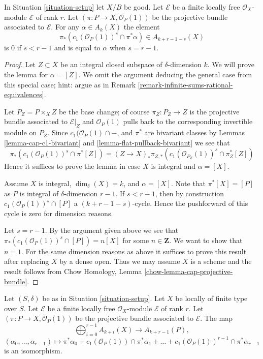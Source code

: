 \begin{lemma}
\label{lemma-cap-projective-bundle}
In Situation \ref{situation-setup} let $X/B$ be good.
Let $\mathcal{E}$ be a finite locally free $\mathcal{O}_X$-module
$\mathcal{E}$ of rank $r$. Let $(\pi : P \to X, \mathcal{O}_P(1))$
be the projective bundle associated to $\mathcal{E}$.
For any $\alpha \in A_k(X)$ the element
$$
\pi_*\left(
c_1(\mathcal{O}_P(1))^s \cap \pi^*\alpha
\right)
\in
A_{k + r - 1 - s}(X)
$$
is $0$ if $s < r - 1$ and is equal to $\alpha$ when $s = r - 1$.
\end{lemma}

\begin{proof}
Let $Z \subset X$ be an integral closed subspace of $\delta$-dimension $k$.
We will prove the lemma for $\alpha = [Z]$. We omit the argument
deducing the general case from this special case; hint: argue as in
Remark \ref{remark-infinite-sums-rational-equivalences}.

\medskip\noindent
Let $P_Z = P \times_X Z$ be the base change; of course
$\pi_Z : P_Z \to Z$ is the projective bundle associated to $\mathcal{E}|_Z$
and $\mathcal{O}_P(1)$ pulls back to the corresponding
invertible module on $P_Z$. Since $c_1(\mathcal{O}_P(1) \cap -$, and
$\pi^*$ are bivariant classes by Lemmas
\ref{lemma-cap-c1-bivariant} and \ref{lemma-flat-pullback-bivariant}
we see that
$$
\pi_*\left(
c_1(\mathcal{O}_P(1))^s \cap \pi^*[Z]
\right)
=
(Z \to X)_*\pi_{Z, *}\left(
c_1(\mathcal{O}_{P_Z}(1))^s \cap \pi_Z^*[Z]
\right)
$$
Hence it suffices to prove the lemma in case $X$ is integral
and $\alpha  = [X]$.

\medskip\noindent
Assume $X$ is integral, $\dim_\delta(X) = k$, and $\alpha = [X]$.
Note that $\pi^*[X] = [P]$ as $P$ is integral of
$\delta$-dimension $r - 1$. If $s < r - 1$, then by construction
$c_1(\mathcal{O}_P(1))^s \cap [P]$ a $(k + r - 1 - s)$-cycle.
Hence the pushforward of this cycle is zero for dimension reasons.

\medskip\noindent
Let $s = r - 1$. By the argument given above we see that
$\pi_*(c_1(\mathcal{O}_P(1))^s \cap [P]) = n [X]$
for some $n \in \mathbf{Z}$. We want to show that $n = 1$.
For the same dimension reasons as above it suffices to prove this
result after replacing $X$ by a dense open.
Thus we may assume $X$ is a scheme and the result follows
from Chow Homology, Lemma \ref{chow-lemma-cap-projective-bundle}.
\end{proof}

\begin{lemma}
\label{lemma-chow-ring-projective-bundle}
Let $(S, \delta)$ be as in Situation \ref{situation-setup}.
Let $X$ be locally of finite type over $S$.
Let $\mathcal{E}$ be a finite locally free $\mathcal{O}_X$-module
$\mathcal{E}$ of rank $r$. Let $(\pi : P \to X, \mathcal{O}_P(1))$
be the projective bundle associated to $\mathcal{E}$.
The map
$$
\bigoplus\nolimits_{i = 0}^{r - 1}
A_{k + i}(X)
\longrightarrow
A_{k + r - 1}(P),
$$
$$
(\alpha_0, \ldots, \alpha_{r-1})
\longmapsto
\pi^*\alpha_0 +
c_1(\mathcal{O}_P(1)) \cap \pi^*\alpha_1
+ \ldots +
c_1(\mathcal{O}_P(1))^{r - 1} \cap \pi^*\alpha_{r-1}
$$
is an isomorphism.
\end{lemma}

